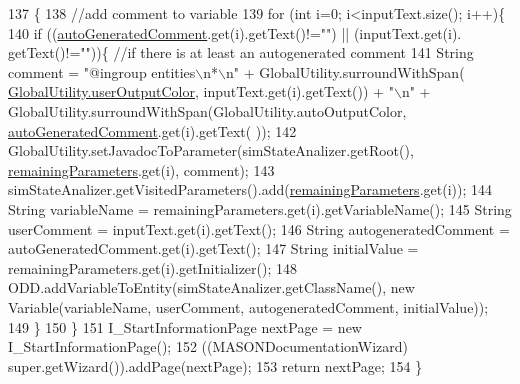 \begin{DoxyCode}
137                                     \{ 
138         \textcolor{comment}{//add comment to variable}
139         \textcolor{keywordflow}{for} (\textcolor{keywordtype}{int} i=0; i<inputText.size(); i++)\{
140             \textcolor{keywordflow}{if} ((\hyperlink{classit_1_1isislab_1_1masonhelperdocumentation_1_1mason_1_1wizards_1_1_h___environment_page_a5495002868c1d72f31f79a3e584fdd60}{autoGeneratedComment}.get(i).getText()!=\textcolor{stringliteral}{""}) || (inputText.get(i).
      getText()!=\textcolor{stringliteral}{""}))\{   \textcolor{comment}{//if there is at least an autogenerated comment}
141                 String comment = \textcolor{stringliteral}{"@ingroup entities\(\backslash\)n*\(\backslash\)n"} + GlobalUtility.surroundWithSpan(
      \hyperlink{classit_1_1isislab_1_1masonhelperdocumentation_1_1analizer_1_1_global_utility_aec864cd710b27ece609c5a6093211ff4}{GlobalUtility.userOutputColor}, inputText.get(i).getText()) + \textcolor{stringliteral}{"\(\backslash\)n"} + 
      GlobalUtility.surroundWithSpan(GlobalUtility.autoOutputColor, \hyperlink{classit_1_1isislab_1_1masonhelperdocumentation_1_1mason_1_1wizards_1_1_h___environment_page_a5495002868c1d72f31f79a3e584fdd60}{autoGeneratedComment}.get(i).getText(
      ));
142                 GlobalUtility.setJavadocToParameter(simStateAnalizer.getRoot(), 
      \hyperlink{classit_1_1isislab_1_1masonhelperdocumentation_1_1mason_1_1wizards_1_1_h___environment_page_a3bfb6dff5b562361a410cd31ff8815ba}{remainingParameters}.get(i), comment);
143                 simStateAnalizer.getVisitedParameters().add(\hyperlink{classit_1_1isislab_1_1masonhelperdocumentation_1_1mason_1_1wizards_1_1_h___environment_page_a3bfb6dff5b562361a410cd31ff8815ba}{remainingParameters}.get(i));
144                 String variableName = remainingParameters.get(i).getVariableName();
145                 String userComment = inputText.get(i).getText();
146                 String autogeneratedComment = autoGeneratedComment.get(i).getText();
147                 String initialValue = remainingParameters.get(i).getInitializer();
148                 ODD.addVariableToEntity(simStateAnalizer.getClassName(), \textcolor{keyword}{new} Variable(variableName, 
      userComment, autogeneratedComment, initialValue));
149             \}
150         \}
151         I\_StartInformationPage nextPage = \textcolor{keyword}{new} I\_StartInformationPage();
152         ((MASONDocumentationWizard) super.getWizard()).addPage(nextPage);
153         \textcolor{keywordflow}{return} nextPage; 
154     \}
\end{DoxyCode}


